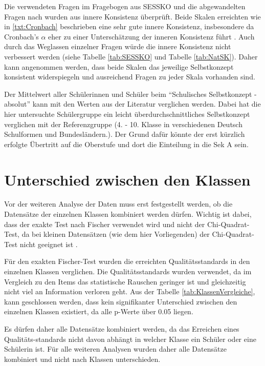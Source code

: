Die verwendeten Fragen im Fragebogen aus SESSKO \citep{Schone2002} und die abgewandelten Fragen nach \citet{Dierks2014} wurden aus innere Konsistenz überprüft. Beide Skalen erreichten wie in \ref{txt:Cronbach} beschrieben eine sehr gute innere Konsistenz, insbesondere da Cronbach's $\alpha$ eher zu einer Unterschätzung der inneren Konsistenz führt \citep{Eisinga2013}. Auch durch das Weglassen einzelner Fragen würde die innere Konsistenz nicht verbessert werden (siehe Tabelle \ref{tab:SESSKO} und Tabelle \ref{tab:NatSK}). Daher kann angenommen werden, dass beide Skalen das jeweilige Selbstkonzept konsistent widerspiegeln und ausreichend Fragen zu jeder Skala vorhanden sind. 

Der Mittelwert aller Schülerinnen und Schüler beim "`Schulisches Selbstkonzept - absolut"' kann mit den Werten aus der Literatur \citep{Schone2002} verglichen werden. Dabei hat die hier untersuchte Schülergruppe ein leicht überdurchschnittliches Selbstkonzept verglichen mit der Referenzgruppe (4. - 10. Klasse in verschiedenen Deutsch Schulformen und Bundesländern.). Der Grund dafür könnte der erst kürzlich erfolgte Übertritt auf die Oberstufe und dort die Einteilung in die Sek A sein. 

\section{Unterschied zwischen den Klassen}

Vor der weiteren Analyse der Daten muss erst festgestellt werden, ob die Datensätze der einzelnen Klassen kombiniert werden dürfen. Wichtig ist dabei, dass der exakte Test nach Fischer verwendet wird und nicht der Chi-Quadrat-Test, da bei kleinen Datensätzen (wie dem hier Vorliegenden) der Chi-Quadrat-Test nicht geeignet ist \citep{Mehta1984}.

Für den exakten Fischer-Test wurden die erreichten Qualitätsstandards in den einzelnen Klassen verglichen. Die Qualitätsstandards wurden verwendet, da im Vergleich zu den Items das statistische Rauschen geringer ist und gleichzeitig nicht viel an Information verloren geht. Aus der Tabelle \ref{tab:KlassenVergleiche}, kann geschlossen werden, dass kein signifikanter Unterschied zwischen den einzelnen Klassen existiert, da alle p-Werte über 0.05 liegen.

Es dürfen daher alle Datensätze kombiniert werden, da das Erreichen eines Qualitäts-standards nicht davon abhängt in welcher Klasse ein Schüler oder eine Schülerin ist. Für alle weiteren Analysen wurden daher alle Datensätze kombiniert und nicht nach Klassen unterschieden.


